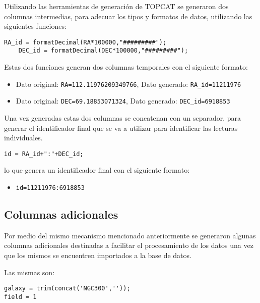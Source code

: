 \documentclass[a4paper,headsepline,footsepline,draft=false]{scrartcl}
\begin{document}
Utilizando las herramientas de generación de TOPCAT se generaron dos columnas intermedias, para adecuar los tipos y formatos de datos, utilizando las siguientes funciones:

\lstset{language=HTML}
\begin{lstlisting}[caption={Funciones para generación de columnas intermedias},captionpos=b,frame=shadowbox]
	RA_id = formatDecimal(RA*100000,"#########");
	DEC_id = formatDecimal(DEC*100000,"#########");
\end{lstlisting}

Estas dos funciones generan dos columnas temporales con el siguiente formato:

\begin{itemize}
	\item Dato original: \texttt{RA=112.11976209349766}, Dato generado: \texttt{RA\_id=11211976}
	\item Dato original: \texttt{DEC=69.18853071324}, Dato generado: \texttt{DEC\_id=6918853}
\end{itemize}

Una vez generadas estas dos columnas se concatenan con un separador, para generar el identificador final que se va a utilizar para identificar las lecturas individuales.

\begin{lstlisting}[caption={Generación de identificador final},captionpos=b,frame=shadowbox]
	id = RA_id+":"+DEC_id;
\end{lstlisting}

lo que genera un identificador final con el siguiente formato:

\begin{itemize}
	\item \texttt{id=11211976:6918853}
\end{itemize}

\subsection{Columnas adicionales}

Por medio del mismo mecanismo mencionado anteriormente se generaron algunas columnas adicionales destinadas a facilitar el procesamiento de los datos una vez que los mismos se encuentren importados a la base de datos.

Las mismas son:

\begin{lstlisting}[caption={Identificación de galaxia y campo de observacion},captionpos=b,frame=shadowbox]
galaxy = trim(concat('NGC300',''));
field = 1
\end{lstlisting}
\end{document}
